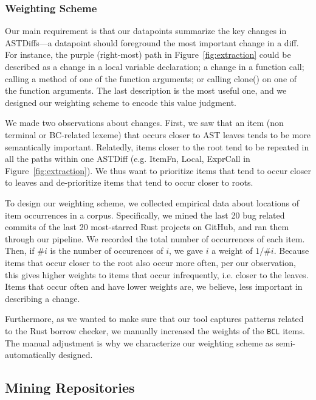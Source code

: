 \subsubsection{\label{sec:weighting_scheme}Weighting Scheme}

Our main requirement is that our datapoints summarize the key changes in ASTDiffs---a datapoint should foreground the most important change in a diff. For instance, the purple (right-most) path in Figure~\ref{fig:extraction} could be described as a change in a local variable declaration; a change in a function call; calling a method of one of the function arguments; or calling clone() on one of the function arguments. The last description is the most useful one, and we designed our weighting scheme to encode this value judgment.

We made two observations about changes. First, we saw that an item (non terminal or BC-related lexeme) that occurs closer to AST leaves tends to be more semantically important. Relatedly, items closer to the root tend to be repeated in all the paths within one ASTDiff (e.g. ItemFn, Local, ExprCall in Figure~\ref{fig:extraction}). We thus want to prioritize items that tend to occur closer to leaves and de-prioritize items that tend to occur closer to roots.

To design our weighting scheme, we collected empirical data about locations of item occurrences in a corpus. Specifically, we mined the last 20 bug related commits of the last 20 most-starred Rust projects on GitHub, and ran them through our pipeline. We recorded the total number of occurrences of each item. Then, if $\# i$ is the number of occurences of $i$, we gave $i$ a weight of $1/\# i$. Because items that occur closer to the root also occur more often, per our observation, this gives higher weights to items that occur infrequently, i.e. closer to the leaves. Items that occur often and have lower weights are, we believe, less important in describing a change.

Furthermore, as we wanted to make sure that our tool captures patterns related to the Rust borrow checker, we manually increased the weights of the \texttt{BCL} items. The manual adjustment is why we characterize our weighting scheme as semi-automatically designed. 

\subsection{\label{sec:mining_repositories}Mining Repositories}

